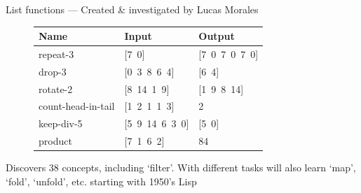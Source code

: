 \documentclass{beamer}
\begin{document}
\begin{frame}{List functions --- \small{Created \& investigated by Lucas
  Morales}}


  \vspace{1cm}
  
  \begin{figure}[b]\centering
\vspace{-0.5cm}  \begin{tabular}{lll}
    \toprule
    Name & Input & Output \\\midrule
    repeat-3 & [7\, 0] & [7\, 0\, 7\, 0\, 7\, 0] \\
    drop-3 & [0\, 3\, 8\, 6\, 4] & [6\, 4] \\
    rotate-2 & [8\, 14\, 1\, 9] & [1\, 9\, 8\, 14] \\
    count-head-in-tail & [1\, 2\, 1\, 1\, 3] & 2 \\
    keep-div-5 & [5\, 9\, 14\, 6\, 3\, 0] & [5\, 0] \\
    product & [7\, 1\, 6\, 2] & 84 \\
    \bottomrule
  \end{tabular}
\end{figure}

  Discovers 38 concepts, including `filter'. With different tasks will also learn `map', `fold', `unfold', etc. starting with 1950's Lisp
\end{frame}
\end{document}
